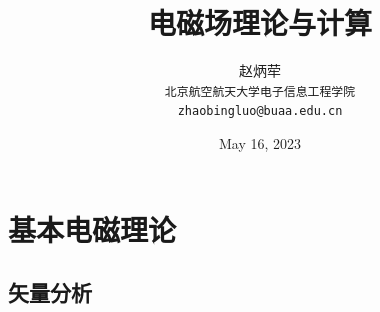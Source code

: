 \documentclass{article}
\numberwithin{equation}{section}
\begin{document}
\setlength{\baselineskip}{15pt}
\setlength{\abovedisplayskip}{1ex}
\setlength{\belowdisplayskip}{1ex}

\date{May 16, 2023}

\author{赵炳荦\\\texttt{北京航空航天大学\quad 电子信息工程学院}\\\texttt{zhaobingluo@buaa.edu.cn}}
\title{\huge\textsf{电磁场理论与计算}}
\maketitle
\tableofcontents

\newpage
\section{\textsf{基本电磁理论}}
\subsection{矢量分析}
\end{document}
